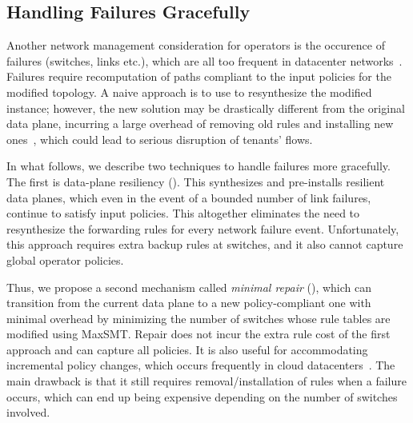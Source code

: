 \subsection{Handling Failures Gracefully}

Another network management consideration for operators is the
occurence of failures (switches, links etc.), which are all too
frequent in datacenter networks~\cite{datacenterfailures}. Failures require
recomputation of paths compliant to the input policies
for the modified topology.  A naive approach is to use \name to
resynthesize the modified instance; however, the new solution may be
drastically different from the original data plane, incurring a large
overhead of removing old rules and installing new
ones~\cite{sdnlatency,updatescheduling}, which could lead to serious
disruption of tenants' flows.


In what follows, we describe two techniques to handle failures more
gracefully. The first is data-plane resiliency ().  
This synthesizes and
pre-installs resilient data planes, which even in the event of a
bounded number of link failures, continue to satisfy input
policies. This altogether eliminates the need to resynthesize the
forwarding rules for every network failure event. Unfortunately, this
approach requires extra backup rules at switches, and it also cannot
capture global operator policies.

Thus, we propose a second mechanism called \emph{minimal repair} (),
which can transition from the current data
plane to a new policy-compliant one with minimal overhead
 by minimizing the number of
switches whose rule tables are modified using 
MaxSMT. Repair does not incur the extra rule cost of the first approach 
and can capture all \Name policies. It is also useful for 
accommodating incremental policy changes, which occurs frequently in
cloud datacenters~\cite{mpa-imc15}. The main drawback is that it still
requires removal/installation of rules when a failure occurs, which
can end up being expensive depending on the number of switches
involved.





